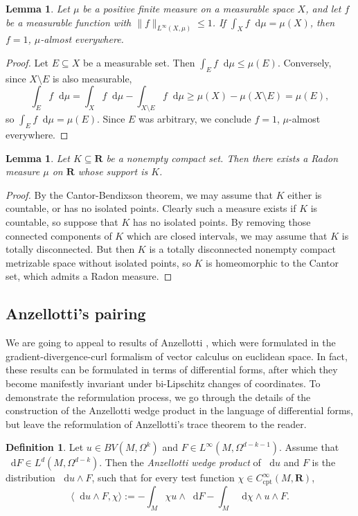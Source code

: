 \documentclass[reqno,11pt]{amsart}
\newcommand{\RR}{\mathbf{R}}
\newcommand*\dif{\mathop{}\!\mathrm{d}}
\newcommand{\dfn}[1]{\emph{#1}\index{#1}}
\newcommand{\cpt}{\mathrm{cpt}}
\newtheorem{lemma}[theorem]{Lemma}
\theoremstyle{definition}
\newtheorem{definition}[theorem]{Definition}
\numberwithin{equation}{section}
\begin{document}
\begin{lemma}\label{measurable function is 1}
Let $\mu$ be a positive finite measure on a measurable space $X$, and let $f$ be a measurable function with $\|f\|_{L^\infty(X, \mu)} \leq 1$.
If $\int_X f \dif \mu = \mu(X)$, then $f = 1$, $\mu$-almost everywhere.
\end{lemma}
\begin{proof}
Let $E \subseteq X$ be a measurable set.
Then $\int_E f \dif \mu \leq \mu(E)$.
Conversely, since $X \setminus E$ is also measurable,
$$\int_E f \dif \mu = \int_X f \dif \mu - \int_{X \setminus E} f \dif \mu \geq \mu(X) - \mu(X \setminus E) = \mu(E),$$
so $\int_E f \dif \mu = \mu(E)$.
Since $E$ was arbitrary, we conclude $f = 1$, $\mu$-almost everywhere.
\end{proof}

\begin{lemma}\label{closed sets are Radon supports}
Let $K \subseteq \RR$ be a nonempty compact set.
Then there exists a Radon measure $\mu$ on $\RR$ whose support is $K$.
\end{lemma}
\begin{proof}
By the Cantor-Bendixson theorem, we may assume that $K$ either is countable, or has no isolated points.
Clearly such a measure exists if $K$ is countable, so suppose that $K$ has no isolated points.
By removing those connected components of $K$ which are closed intervals, we may assume that $K$ is totally disconnected.
But then $K$ is a totally disconnected nonempty compact metrizable space without isolated points, so $K$ is homeomorphic to the Cantor set, which admits a Radon measure.
\end{proof}

\subsection{Anzellotti's pairing}
We are going to appeal to results of Anzellotti \cite{Anzellotti1983}, which were formulated in the gradient-divergence-curl formalism of vector calculus on euclidean space.
In fact, these results can be formulated in terms of differential forms, after which they become manifestly invariant under bi-Lipschitz changes of coordinates.
To demonstrate the reformulation process, we go through the details of the construction of the Anzellotti wedge product in the language of differential forms, but leave the reformulation of Anzellotti's trace theorem to the reader.

\begin{definition}
Let $u \in BV(M, \Omega^k)$ and $F \in L^\infty(M, \Omega^{d - k - 1})$.
Assume that $\dif F \in L^d(M, \Omega^{d - k})$.
Then the \dfn{Anzellotti wedge product} of $\dif u$ and $F$ is the distribution $\dif u \wedge F$, such that for every test function $\chi \in C^\infty_\cpt(M, \RR)$,
$$\langle \dif u \wedge F, \chi\rangle := -\int_M \chi u \wedge \dif F - \int_M \dif \chi \wedge u \wedge F.$$
\end{definition}
\end{document}
